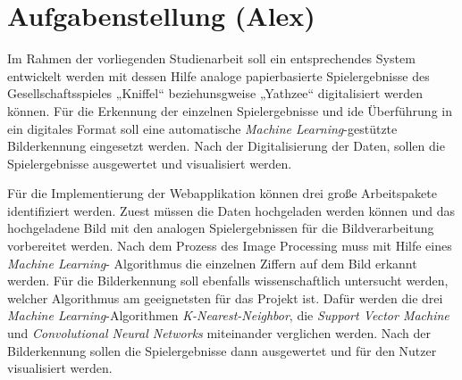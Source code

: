 \section{Aufgabenstellung (Alex)}
Im Rahmen der vorliegenden Studienarbeit soll ein entsprechendes System entwickelt werden mit dessen Hilfe analoge papierbasierte Spielergebnisse des
Gesellschaftsspieles „Kniffel“ beziehunsgweise „Yathzee“ digitalisiert werden können. Für die Erkennung der einzelnen Spielergebnisse und ide Überführung in ein digitales 
Format soll eine automatische \textit{Machine Learning}-gestützte Bilderkennung eingesetzt werden. Nach der Digitalisierung der Daten, sollen die Spielergebnisse
ausgewertet und visualisiert werden.

Für die Implementierung der Webapplikation können drei große Arbeitspakete identifiziert werden. Zuest müssen die Daten hochgeladen werden können und das hochgeladene
Bild mit den analogen Spielergebnissen für die Bildverarbeitung vorbereitet werden. Nach dem Prozess des Image Processing muss mit Hilfe eines \textit{Machine Learning}-
Algorithmus die einzelnen Ziffern auf dem Bild erkannt werden. Für die Bilderkennung soll ebenfalls wissenschaftlich untersucht werden, welcher Algorithmus am 
geeignetsten für das Projekt ist. Dafür werden die drei \textit{Machine Learning}-Algorithmen \textit{K-Nearest-Neighbor}, die \textit{Support Vector Machine} und
\textit{Convolutional Neural Networks} miteinander verglichen werden.
Nach der Bilderkennung sollen die Spielergebnisse dann ausgewertet und für den Nutzer visualisiert werden.


